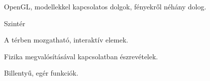 



OpenGL, modellekkel kapcsolatos dolgok, fényekről néhány dolog.


Szintér

A térben mozgatható, interaktív elemek.

Fizika megvalósításával kapcsolatban észrevételek.


Billentyű, egér funkciók.
